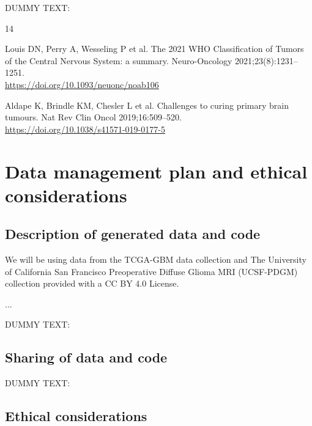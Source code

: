 \documentclass[11pt]{article}
\begin{document}
DUMMY TEXT:
\lipsum[7]


\begin{footnotesize}
\begin{thebibliography}{14} 

 Louis DN, Perry A, Wesseling P et al. The 2021 WHO Classification of Tumors of the Central Nervous System: a summary. Neuro-Oncology 2021;23(8):1231–1251.\\ \scriptsize{\url{https://doi.org/10.1093/neuonc/noab106}}

 Aldape K, Brindle KM, Chesler L et al. Challenges to curing primary brain tumours. Nat Rev Clin Oncol 2019;16:509–520.\\ \scriptsize{\url{https://doi.org/10.1038/s41571-019-0177-5}}


\end{thebibliography}
\end{footnotesize}

\newpage

\section{Data management plan and ethical considerations}

\subsection{Description of generated data and code}

We will be using data from the TCGA-GBM data collection \cite{TCGA-GBM} and The University of California San Francisco Preoperative Diffuse Glioma MRI (UCSF-PDGM) collection \cite{UCSF-PDGM,Calabrese2022} provided with a CC BY 4.0 License.

...

DUMMY TEXT:
\lipsum[8]

\subsection{Sharing of data and code}

DUMMY TEXT:
\lipsum[9]

\subsection{Ethical considerations}
\end{document}
